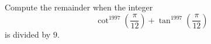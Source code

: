Compute the remainder when the integer
\[\cot^{1997}\left(\dfrac{\pi}{12}\right)+\tan^{1997}\left(\dfrac{\pi}{12}\right)\]
is divided by $9$.
